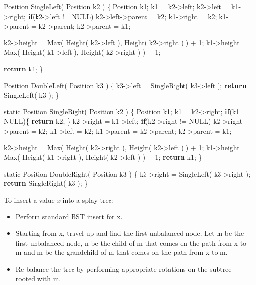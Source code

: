 \documentclass[]{article}
\newenvironment{Shaded}{}{}
\newcommand{\DecValTok}[1]{\textcolor[rgb]{0.25,0.63,0.44}{#1}}
\newcommand{\ControlFlowTok}[1]{\textcolor[rgb]{0.00,0.44,0.13}{\textbf{#1}}}
\newcommand{\AttributeTok}[1]{\textcolor[rgb]{0.49,0.56,0.16}{#1}}
\newcommand{\NormalTok}[1]{#1}
\begin{document}
\begin{Shaded}
\begin{Highlighting}[]
\NormalTok{Position SingleLeft( Position k2 )}
\NormalTok{\{}
\NormalTok{    Position k1;}
\NormalTok{    k1 = k2->left;}
\NormalTok{    k2->left = k1->right;}
    \ControlFlowTok{if}\NormalTok{(k2->left != NULL)}
\NormalTok{        k2->left->parent = k2;}
\NormalTok{    k1->right = k2;}
\NormalTok{    k1->parent = k2->parent;}
\NormalTok{    k2->parent = k1;}
    
\NormalTok{    k2->height = Max( Height( k2->left ), Height( k2->right ) ) + }\DecValTok{1}\NormalTok{;}
\NormalTok{    k1->height = Max( Height( k1->left ), Height( k2->right ) ) + }\DecValTok{1}\NormalTok{;}
    
    \ControlFlowTok{return}\NormalTok{ k1;}
\NormalTok{\}}

\NormalTok{Position DoubleLeft( Position k3 )}
\NormalTok{\{}
\NormalTok{    k3->left = SingleRight( k3->left );}
    \ControlFlowTok{return}\NormalTok{ SingleLeft( k3 );}
\NormalTok{\}}

\AttributeTok{static}\NormalTok{ Position SingleRight( Position k2 )}
\NormalTok{\{}
\NormalTok{    Position k1;}
\NormalTok{    k1 = k2->right;}
    \ControlFlowTok{if}\NormalTok{(k1 == NULL)\{}
        \ControlFlowTok{return}\NormalTok{ k2;}
\NormalTok{    \}}
\NormalTok{    k2->right = k1->left;}
    \ControlFlowTok{if}\NormalTok{(k2->right != NULL)}
\NormalTok{        k2->right->parent = k2;}
\NormalTok{    k1->left = k2;}
\NormalTok{    k1->parent = k2->parent;}
\NormalTok{    k2->parent = k1;}
    
\NormalTok{    k2->height = Max( Height( k2->right ), Height( k2->left ) ) + }\DecValTok{1}\NormalTok{;}
\NormalTok{    k1->height = Max( Height( k1->right ), Height( k2->left ) ) + }\DecValTok{1}\NormalTok{;   }
    \ControlFlowTok{return}\NormalTok{ k1;}
\NormalTok{\}}

\AttributeTok{static}\NormalTok{ Position DoubleRight( Position k3 )}
\NormalTok{\{}
\NormalTok{    k3->right = SingleLeft( k3->right );}
    \ControlFlowTok{return}\NormalTok{ SingleRight( k3 );}
\NormalTok{\}}
\end{Highlighting}
\end{Shaded}

 To insert a value \emph{x} into a splay tree:

\begin{itemize}
\item
  Perform standard BST insert for x.
\item
  Starting from x, travel up and find the first unbalanced node. Let m
  be the first unbalanced node, n be the child of m that comes on the
  path from x to m and m be the grandchild of m that comes on the path
  from x to m.
\item
  Re-balance the tree by performing appropriate rotations on the subtree
  rooted with m. 
\end{itemize}
\end{document}
